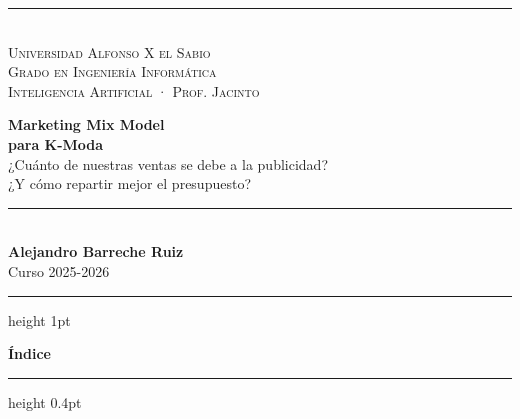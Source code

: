 \documentclass[11pt,a4paper]{article}
\begin{document}
\begin{titlepage}
\thispagestyle{empty}
\pagecolor{kmbg}
\color{kmcream}
\vspace*{2cm}

\begin{flushleft}
{\color{kmgold}\rule{5cm}{2pt}}\\[0.4cm]
{\Large\textsc{Universidad Alfonso X el Sabio}}\\[0.2cm]
{\large\textsc{Grado en Ingeniería Informática}}\\[0.2cm]
{\normalsize\color{kmgold}\textsc{Inteligencia Artificial · Prof. Jacinto}}\\
\end{flushleft}

\vfill

\begin{flushleft}
{\Huge\bfseries\color{kmcream} Marketing Mix Model}\\[0.3cm]
{\Huge\bfseries\color{kmgold} para K-Moda}\\[0.8cm]
{\Large\color{kmcream}¿Cuánto de nuestras ventas se debe a la publicidad?}\\[0.25cm]
{\Large\color{kmgray}¿Y cómo repartir mejor el presupuesto?}\\
\end{flushleft}

\vfill

\begin{flushleft}
{\color{kmgold}\rule{5cm}{1pt}}\\[0.3cm]
{\large\bfseries\color{kmcream}Alejandro Barreche Ruiz}\\[0.1cm]
{\normalsize\color{kmgray}Curso 2025-2026}\\
\end{flushleft}

\vspace{1cm}
\end{titlepage}

\nopagecolor

\setcounter{page}{1}
{\color{kmgolddark}\hrule height 1pt}
\vspace{6pt}
{\Large\bfseries\color{kmcharcoal}Índice}
\vspace{6pt}
{\color{kmgold}\hrule height 0.4pt}
\vspace{10pt}

\renewcommand{\contentsname}{}
\setcounter{tocdepth}{1}
\tableofcontents
\vfill

\newpage
{}
\setcounter{page}{1}


\newpage

\newpage

\newpage

\newpage

\newpage

\newpage

\newpage

\end{document}
